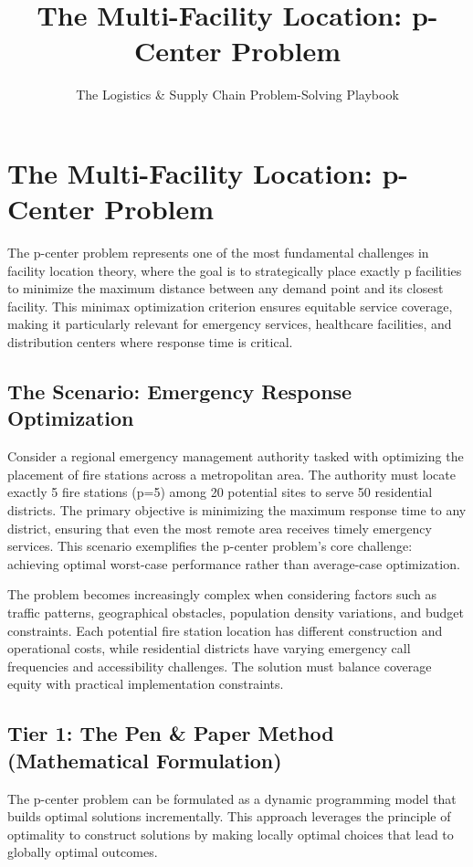 \documentclass{article}
\title{The Multi-Facility Location: p-Center Problem}
\author{The Logistics \& Supply Chain Problem-Solving Playbook}
\date{}
\begin{document}
\maketitle

\section{The Multi-Facility Location: p-Center Problem}

The p-center problem represents one of the most fundamental challenges in facility location theory, where the goal is to strategically place exactly p facilities to minimize the maximum distance between any demand point and its closest facility. This minimax optimization criterion ensures equitable service coverage, making it particularly relevant for emergency services, healthcare facilities, and distribution centers where response time is critical.

\subsection{The Scenario: Emergency Response Optimization}

Consider a regional emergency management authority tasked with optimizing the placement of fire stations across a metropolitan area. The authority must locate exactly 5 fire stations (p=5) among 20 potential sites to serve 50 residential districts. The primary objective is minimizing the maximum response time to any district, ensuring that even the most remote area receives timely emergency services. This scenario exemplifies the p-center problem's core challenge: achieving optimal worst-case performance rather than average-case optimization.

The problem becomes increasingly complex when considering factors such as traffic patterns, geographical obstacles, population density variations, and budget constraints. Each potential fire station location has different construction and operational costs, while residential districts have varying emergency call frequencies and accessibility challenges. The solution must balance coverage equity with practical implementation constraints.

\subsection{Tier 1: The Pen \& Paper Method (Mathematical Formulation)}

The p-center problem can be formulated as a dynamic programming model that builds optimal solutions incrementally. This approach leverages the principle of optimality to construct solutions by making locally optimal choices that lead to globally optimal outcomes.
\end{document}
